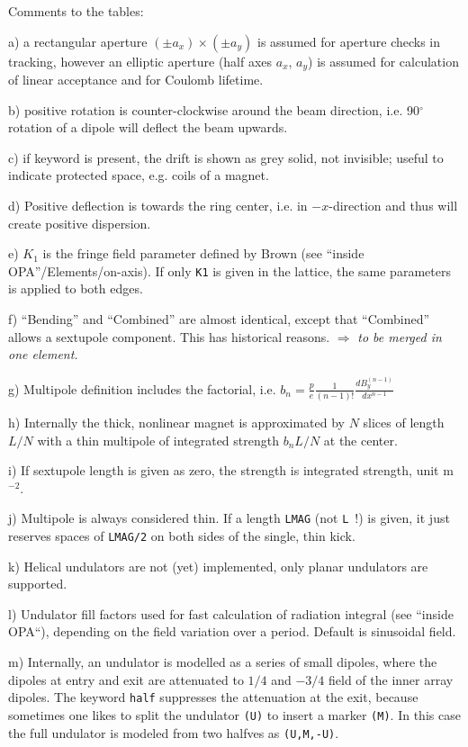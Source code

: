 \documentclass[12pt]{article}
\newcommand{\degree}{\mbox{$^{\circ}$}}
\newcommand\todo[1]{$\Longrightarrow$ {\em #1} }
\newcommand\code[1]{{\tt #1}}
\begin{document}
Comments to the tables:

a) a rectangular aperture $(\pm a_x)\times(\pm a_y)$ is assumed for aperture checks in tracking, however an elliptic aperture (half axes $a_x$, $a_y$) is assumed for calculation of linear acceptance and for Coulomb lifetime.

b) positive rotation is counter-clockwise around the beam direction, i.e. 90\degree rotation of a dipole will deflect the beam upwards.

c) if keyword is present, the drift is shown as grey solid, not invisible; useful to indicate protected space, e.g. coils of a magnet.

d) Positive deflection is towards the ring center, i.e. in $-x$-direction and thus will create positive dispersion.

e) $K_1$ is the fringe field parameter defined by Brown (see ``inside OPA''/Elements/on-axis). If only {\tt K1} is given in the lattice, the same parameters is applied to both edges. 

f) ``Bending'' and ``Combined'' are almost identical, except that ``Combined'' allows a sextupole component. This has historical reasons. \todo{to be merged in one element.}

g) Multipole definition includes the factorial, i.e. $b_n = \frac{p}{e}\frac{1}{(n-1)!}\frac{d B^{(n-1)}_y}{d x^{n-1}}$

h) Internally the thick, nonlinear magnet is approximated by $N$ slices of length $L/N$ with a thin multipole of integrated strength $b_nL/N$ at the center.

i) If sextupole length is given as zero, the strength is integrated strength, unit m$^{-2}$.

j) Multipole is always considered thin. If a length {\tt LMAG} (not \code{L}~!) is given, it just reserves spaces of {\tt LMAG/2} on both sides of the single, thin kick.

k) Helical undulators are not (yet) implemented, only planar undulators are supported.

l) Undulator fill factors used for fast calculation of radiation integral (see ``inside OPA``), depending on the field variation over a period. Default is sinusoidal field. 

m) Internally, an undulator is modelled as a series of small dipoles, where the dipoles at entry and exit are attenuated to $1/4$ and $-3/4$ field of the inner array dipoles. The keyword {\tt half} suppresses the attenuation at the exit, because sometimes one likes to split the undulator {\tt(U)} to insert a marker {\tt(M)}. In this case the full undulator is modeled from two halfves as {\tt(U,M,-U)}.
\end{document}
